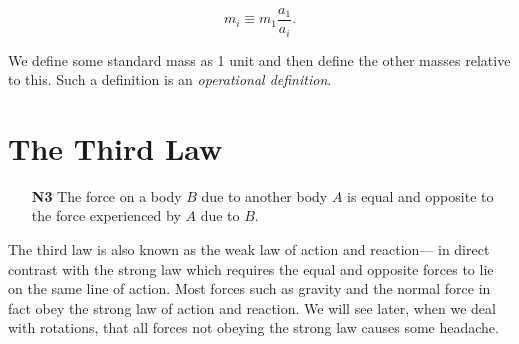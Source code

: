 \[
m_i \equiv m_1 \frac{a_1}{a_i}.
\]

We define some standard mass as 1 unit and then define the other masses 
relative to this. Such a definition is an \emph{operational definition}.

\section{The Third Law}

\begin{enumerate}
    \item[\textbf{N3}] The force on a body \(B\) due to another body \(A\) is equal and opposite to the force experienced
    by \(A\) due to \(B\). 
\end{enumerate}

The third law is also known as the weak law of action and reaction— in direct contrast with
the strong law which requires the equal and opposite forces to lie on the same line of action.
Most forces such as gravity and the normal force in fact obey the strong law of action and
reaction. We will see later, when we deal with rotations, that all forces not obeying the strong law causes some headache.